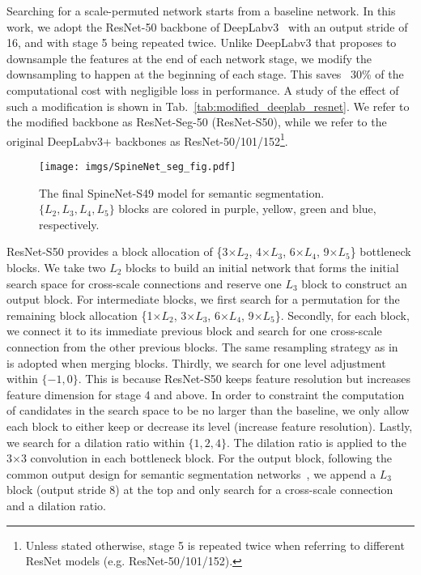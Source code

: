\documentclass[10pt,twocolumn,letterpaper]{article}
\begin{document}
Searching for a scale-permuted network starts from a baseline network. In this work, we adopt the ResNet-50 backbone of DeepLabv3~\cite{deeplabv3} with an output stride of 16, and with stage 5 being repeated twice. Unlike DeepLabv3 that proposes to downsample the features at the end of each network stage, we modify the downsampling to happen at the beginning of each stage. This saves ~30\% of the computational cost with negligible loss in performance. A study of the effect of such a modification is shown in Tab.~\ref{tab:modified_deeplab_resnet}. We refer to the modified backbone as ResNet-Seg-50 (ResNet-S50), while we refer to the original DeepLabv3+ backbones as ResNet-50/101/152\footnote{Unless stated otherwise, stage 5 is repeated twice when referring to different ResNet models (e.g. ResNet-50/101/152).}.

\begin{figure}[t!]
    \begin{center}
    \texttt{[image: imgs/SpineNet\_seg\_fig.pdf]}
    \end{center}
    \caption{The final SpineNet-S49 model for semantic segmentation. $\{L_2,L_3,L_4,L_5\}$ blocks are colored in purple, yellow, green and blue, respectively.}
    \label{fig:architecture}
\end{figure}


ResNet-S50 provides a block allocation of \{3$\times L_2$, 4$\times L_3$, 6$\times L_4$, 9$\times L_5$\} bottleneck blocks. We take two $L_2$ blocks to build an initial network that forms the initial search space for cross-scale connections and reserve one $L_3$ block to construct an output block. For intermediate blocks, we first search for a permutation for the remaining block allocation \{1$\times L_2$, 3$\times L_3$, 6$\times L_4$, 9$\times L_5$\}. Secondly, for each block, we connect it to its immediate previous block and search for one cross-scale connection from the other previous blocks. The same resampling strategy as in~\cite{spinenet} is adopted when merging blocks. Thirdly, we search for one level adjustment within $\{-1, 0\}$. This is because ResNet-S50 keeps feature resolution but increases feature dimension for stage 4 and above. In order to constraint the computation of candidates in the search space to be no larger than the baseline, we only allow each block to either keep or decrease its level (\ie increase feature resolution). Lastly, we search for a dilation ratio within $\{1, 2, 4\}$. The dilation ratio is applied to the 3$\times$3 convolution in each bottleneck block. For the output block, following the common output design for semantic segmentation networks~\cite{deeplabv3,deeplabv3plus,mobilenetv3}, we append a $L_3$ block (\ie output stride 8) at the top and only search for a cross-scale connection and a dilation ratio.
\end{document}
